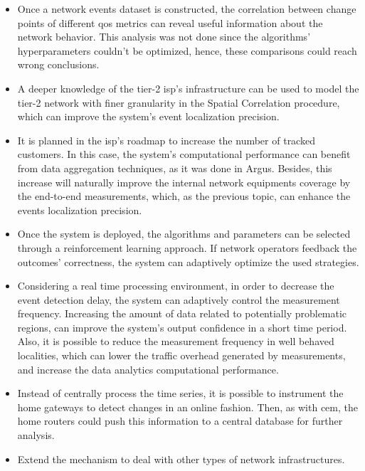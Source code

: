 \begin{itemize}
\item
Once a network events dataset is constructed, the correlation between
change points of different \gls*{qos} metrics can reveal useful information
about the network behavior. This analysis was not done since the algorithms'
hyperparameters couldn't be optimized, hence, these comparisons could reach
wrong conclusions.

\item
A deeper knowledge of the tier-2 \gls*{isp}'s infrastructure
can be used to model the tier-2 network with finer granularity in the Spatial
Correlation procedure, which can improve the system's event localization
precision.

\item
It is planned in the \gls*{isp}'s roadmap to increase the number of tracked customers.
In this case, the system's computational performance can benefit from data
aggregation techniques, as it was done in Argus.
Besides, this increase will naturally improve the internal network equipments
coverage by the end-to-end measurements, which, as the previous topic, can
enhance the events localization precision.

\item
Once the system is deployed, the algorithms and parameters can be selected
through a reinforcement learning approach. If network operators
feedback the outcomes' correctness, the system can adaptively optimize the used
strategies.

\item
Considering a real time processing environment, in order to decrease the
event detection delay, the system can adaptively control the measurement
frequency.
Increasing the amount of data related to potentially problematic regions,
can improve the system's output confidence in a short time period.
Also, it is possible to reduce the measurement frequency in well behaved
localities, which can lower the traffic overhead generated by measurements, and
increase the data analytics computational performance.

\item
Instead of centrally process the time series,
it is possible to instrument the home
gateways to detect changes in an online fashion. Then, as with \gls*{cem}, the home
routers could push this information to a central database for further analysis.

\item
Extend the mechanism to deal with other types of network infrastructures.

\end{itemize}
